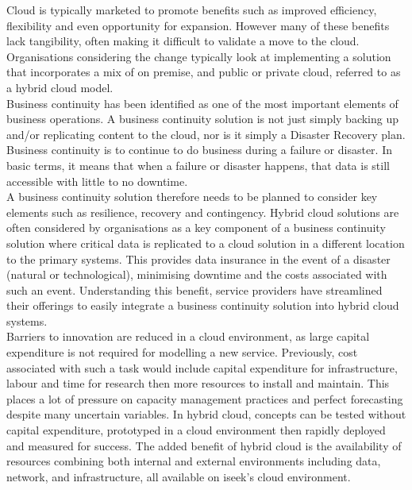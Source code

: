 \documentclass[a4paper,12pt]{report}
\begin{document}
Cloud is typically marketed to promote benefits such as improved efficiency, flexibility and even opportunity for expansion. However many of these benefits lack tangibility, often making it difficult to validate a move to the cloud.\\

Organisations considering the change typically look at implementing a solution that incorporates a mix of on premise, and public or private cloud, referred to as a hybrid cloud model.\\

Business continuity has been identified as one of the most important elements of business operations. A business continuity solution is not just simply backing up and/or replicating content to the cloud, nor is it simply a Disaster Recovery plan. Business continuity is to continue to do business during a failure or disaster. In basic terms, it means that when a failure or disaster happens, that data is still accessible with little to no downtime.\\

A business continuity solution therefore needs to be planned to consider key elements such as resilience, recovery and contingency. Hybrid cloud solutions are often considered by organisations as a key component of a business continuity solution where critical data is replicated to a cloud solution in a different location to the primary systems. This provides data insurance in the event of a disaster (natural or technological), minimising downtime and the costs associated with such an event. Understanding this benefit, service providers have streamlined their offerings to easily integrate a business continuity solution into hybrid cloud systems.\\

Barriers to innovation are reduced in a cloud environment, as large capital expenditure is not required for modelling a new service. Previously, cost associated with such a task would include capital expenditure for infrastructure, labour and time for research then more resources to install and maintain. This places a lot of pressure on capacity management practices and perfect forecasting despite many uncertain variables. In hybrid cloud, concepts can be tested without capital expenditure, prototyped in a cloud environment then rapidly deployed and measured for success. The added benefit of hybrid cloud is the availability of resources combining both internal and external environments including data, network, and infrastructure, all available on iseek’s cloud environment.\\
\end{document}
